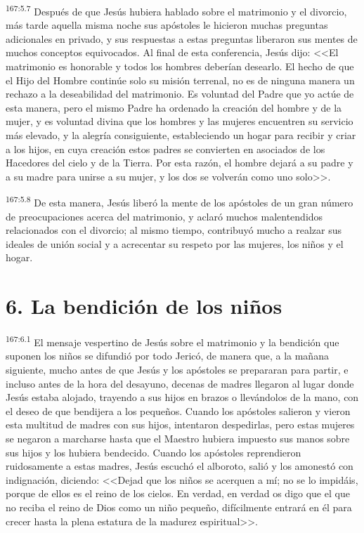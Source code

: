 \par 
\textsuperscript{167:5.7} Después de que Jesús hubiera hablado sobre el matrimonio y el divorcio, más tarde aquella misma noche sus apóstoles le hicieron muchas preguntas adicionales en privado, y sus respuestas a estas preguntas liberaron sus mentes de muchos conceptos equivocados. Al final de esta conferencia, Jesús dijo: <<El matrimonio es honorable y todos los hombres deberían desearlo. El hecho de que el Hijo del Hombre continúe solo su misión terrenal, no es de ninguna manera un rechazo a la deseabilidad del matrimonio. Es voluntad del Padre que yo actúe de esta manera, pero el mismo Padre ha ordenado la creación del hombre y de la mujer, y es voluntad divina que los hombres y las mujeres encuentren su servicio más elevado, y la alegría consiguiente, estableciendo un hogar para recibir y criar a los hijos, en cuya creación estos padres se convierten en asociados de los Hacedores del cielo y de la Tierra. Por esta razón, el hombre dejará a su padre y a su madre para unirse a su mujer, y los dos se volverán como uno solo>>.

\par 
\textsuperscript{167:5.8} De esta manera, Jesús liberó la mente de los apóstoles de un gran número de preocupaciones acerca del matrimonio, y aclaró muchos malentendidos relacionados con el divorcio; al mismo tiempo, contribuyó mucho a realzar sus ideales de unión social y a acrecentar su respeto por las mujeres, los niños y el hogar.

\section*{6. La bendición de los niños}
\par 
\textsuperscript{167:6.1} El mensaje vespertino de Jesús sobre el matrimonio y la bendición que suponen los niños se difundió por todo Jericó, de manera que, a la mañana siguiente, mucho antes de que Jesús y los apóstoles se prepararan para partir, e incluso antes de la hora del desayuno, decenas de madres llegaron al lugar donde Jesús estaba alojado, trayendo a sus hijos en brazos o llevándolos de la mano, con el deseo de que bendijera a los pequeños. Cuando los apóstoles salieron y vieron esta multitud de madres con sus hijos, intentaron despedirlas, pero estas mujeres se negaron a marcharse hasta que el Maestro hubiera impuesto sus manos sobre sus hijos y los hubiera bendecido. Cuando los apóstoles reprendieron ruidosamente a estas madres, Jesús escuchó el alboroto, salió y los amonestó con indignación, diciendo: <<Dejad que los niños se acerquen a mí; no se lo impidáis, porque de ellos es el reino de los cielos. En verdad, en verdad os digo que el que no reciba el reino de Dios como un niño pequeño, difícilmente entrará en él para crecer hasta la plena estatura de la madurez espiritual>>.

